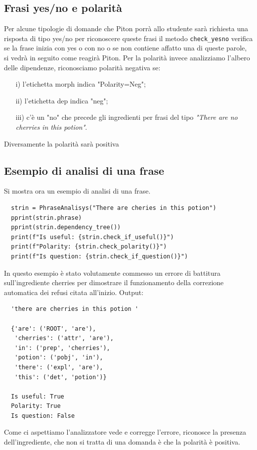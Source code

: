 \subsection{Frasi yes/no e polarità}
Per alcune tipologie di domande che Piton porrà allo studente sarà richiesta una risposta di tipo yes/no per riconoscere queste frasi il metodo \texttt{check\_yesno} verifica se la frase inizia con yes o con no o se non contiene affatto una di queste parole, si vedrà in seguito come reagirà Piton.
Per la polarità invece analizziamo l'albero delle dipendenze, riconosciamo polarità negativa se:
\begin{itemize}
    \item[i)] l'etichetta morph indica "Polarity=Neg";
    \item[ii)] l'etichetta dep indica "neg";
    \item[iii)] c'è un "no" che precede gli ingredienti per frasi del tipo \textit{"There are no cherries in this potion"}.
\end{itemize}
Diversamente la polarità sarà positiva
\subsection{Esempio di analisi di una frase}
Si mostra ora un esempio di analisi di una frase.
\begin{lstlisting}
  strin = PhraseAnalisys("There are cheries in this potion")
  pprint(strin.phrase)
  pprint(strin.dependency_tree())
  print(f"Is useful: {strin.check_if_useful()}")
  print(f"Polarity: {strin.check_polarity()}")
  print(f"Is question: {strin.check_if_question()}")
\end{lstlisting}
In questo esempio è stato volutamente commesso un errore di battitura sull'ingrediente cherries per dimostrare il funzionamento della correzione automatica dei refusi citata all'inizio.
\newline
\newline
Output:
\begin{lstlisting}
  'there are cherries in this potion '

  {'are': ('ROOT', 'are'),
   'cherries': ('attr', 'are'),
   'in': ('prep', 'cherries'),
   'potion': ('pobj', 'in'),
   'there': ('expl', 'are'),
   'this': ('det', 'potion')}

  Is useful: True
  Polarity: True
  Is question: False
\end{lstlisting}

Come ci aspettiamo l'analizzatore vede e corregge l'errore, riconosce la presenza dell'ingrediente, che non si tratta di una domanda è che la polarità è positiva.